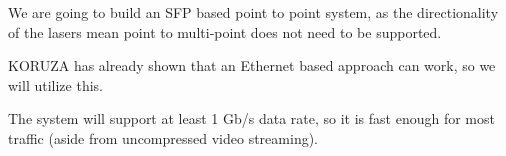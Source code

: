 We are going to build an \ac{SFP} based point to point system, as the
directionality of the lasers mean point to multi-point does not need to be
supported.

KORUZA has already shown that an Ethernet based approach can work, so we will
utilize this.

The system will support at least 1 Gb/s data rate, so it is fast enough
for most traffic (aside from uncompressed video streaming).
